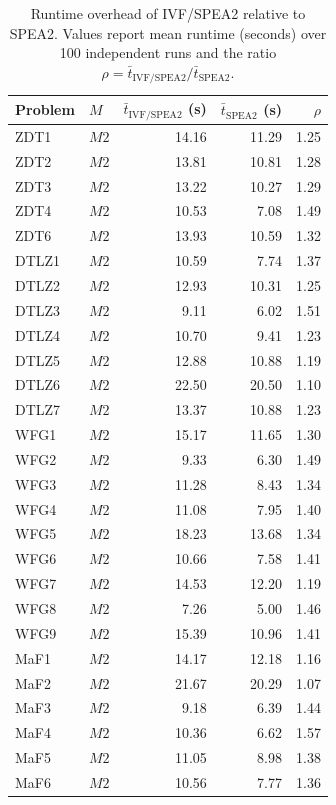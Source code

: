 \begin{table}[t]
\caption{Runtime overhead of IVF/SPEA2 relative to SPEA2. Values report mean runtime (seconds) over 100 independent runs and the ratio $\rho = \bar{t}_{\mathrm{IVF/SPEA2}} / \bar{t}_{\mathrm{SPEA2}}$.}\label{tab:runtime_overhead}
\centering
\scriptsize
\begin{tabular}{llrrr}
\toprule
Problem & $M$ & $\bar{t}_{\mathrm{IVF/SPEA2}}$ (s) & $\bar{t}_{\mathrm{SPEA2}}$ (s) & $\rho$ \\
\midrule
ZDT1 & $M2$ & 14.16 & 11.29 & 1.25 \\
ZDT2 & $M2$ & 13.81 & 10.81 & 1.28 \\
ZDT3 & $M2$ & 13.22 & 10.27 & 1.29 \\
ZDT4 & $M2$ & 10.53 & 7.08 & 1.49 \\
ZDT6 & $M2$ & 13.93 & 10.59 & 1.32 \\
DTLZ1 & $M2$ & 10.59 & 7.74 & 1.37 \\
DTLZ2 & $M2$ & 12.93 & 10.31 & 1.25 \\
DTLZ3 & $M2$ & 9.11 & 6.02 & 1.51 \\
DTLZ4 & $M2$ & 10.70 & 9.41 & 1.23 \\
DTLZ5 & $M2$ & 12.88 & 10.88 & 1.19 \\
DTLZ6 & $M2$ & 22.50 & 20.50 & 1.10 \\
DTLZ7 & $M2$ & 13.37 & 10.88 & 1.23 \\
WFG1 & $M2$ & 15.17 & 11.65 & 1.30 \\
WFG2 & $M2$ & 9.33 & 6.30 & 1.49 \\
WFG3 & $M2$ & 11.28 & 8.43 & 1.34 \\
WFG4 & $M2$ & 11.08 & 7.95 & 1.40 \\
WFG5 & $M2$ & 18.23 & 13.68 & 1.34 \\
WFG6 & $M2$ & 10.66 & 7.58 & 1.41 \\
WFG7 & $M2$ & 14.53 & 12.20 & 1.19 \\
WFG8 & $M2$ & 7.26 & 5.00 & 1.46 \\
WFG9 & $M2$ & 15.39 & 10.96 & 1.41 \\
MaF1 & $M2$ & 14.17 & 12.18 & 1.16 \\
MaF2 & $M2$ & 21.67 & 20.29 & 1.07 \\
MaF3 & $M2$ & 9.18 & 6.39 & 1.44 \\
MaF4 & $M2$ & 10.36 & 6.62 & 1.57 \\
MaF5 & $M2$ & 11.05 & 8.98 & 1.38 \\
MaF6 & $M2$ & 10.56 & 7.77 & 1.36 \\

\end{tabular}
\end{table}
